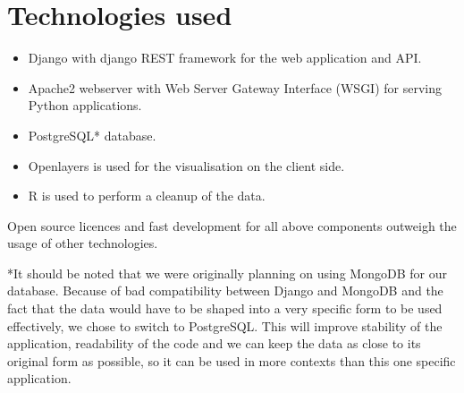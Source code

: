 \section{Technologies used}

\begin{itemize}
 \item Django with django REST framework for the web application and API.
 \item Apache2 webserver with Web Server Gateway Interface (WSGI) for serving Python applications.
  \item PostgreSQL* database.
  \item Openlayers is used for the visualisation on the client side. \cite{openlayers}
  \item R is used to perform a cleanup of the data.
\end{itemize}

Open source licences and fast development for all above components outweigh the usage of other technologies.

*It should be noted that we were originally planning on using MongoDB for our database. Because of bad compatibility between Django and MongoDB and the fact that the data would have to be shaped into a very specific form to be used effectively, we chose to switch to PostgreSQL.
This will improve stability of the application, readability of the code and we can keep the data as close to its original form as possible, so it can be used in more contexts than this one specific application.

